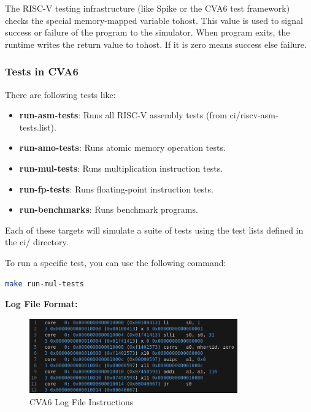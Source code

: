 \documentclass[12pt, a4paper]{article}
\begin{document}
The RISC-V testing infrastructure (like Spike or the CVA6 test framework) checks the special memory-mapped variable tohost. This value is used to signal success or failure of the program to the simulator.
When program exits, the runtime writes the return value to tohost. If it is zero means success else failure.

\subsubsection{Tests in CVA6}

There are following tests like:

\begin{itemize}[nosep]
    \item \textbf{run-asm-tests}: Runs all RISC-V assembly tests (from ci/riscv-asm-tests.list).
    \item \textbf{run-amo-tests}: Runs atomic memory operation tests.
    \item \textbf{run-mul-tests}: Runs multiplication instruction tests.
    \item \textbf{run-fp-tests}: Runs floating-point instruction tests.
    \item \textbf{run-benchmarks}: Runs benchmark programs.
\end{itemize}

Each of these targets will simulate a suite of tests using the test lists defined in the ci/ directory.

To run a specific test, you can use the following command:
\begin{lstlisting}[language=bash, frame=single, basicstyle=\ttfamily\footnotesize, numbers = none]
   make run-mul-tests
\end{lstlisting}

\textbf{Log File Format:}

\begin{figure}[h]
    \centering
    \includegraphics[width=0.8\textwidth]{CVA6_log_file.png}
    \caption{CVA6 Log File Instructions}
    \label{fig:cva6_log_format}
\end{figure}
\end{document}
